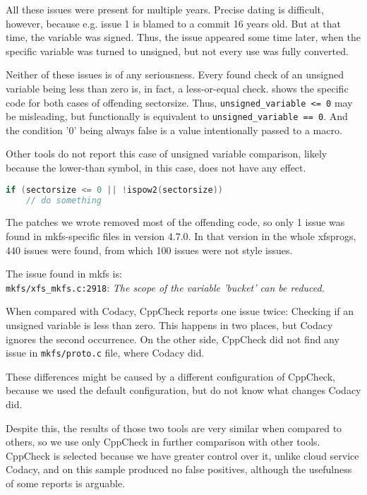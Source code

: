 All these issues were present for multiple years. Precise dating is
difficult, however, because e.g. issue 1 is blamed to a commit 16 years
old. But at that time, the variable was signed. Thus, the issue appeared
some time later, when the specific variable was turned to unsigned, but not
every use was fully converted.

Neither of these issues is of any seriousness. Every found check of an
unsigned variable being less than zero is, in fact, a less-or-equal
check.  shows the specific code for both cases
of offending sectorsize. Thus, {\tt unsigned\_variable <= 0} may be
misleading, but functionally is equivalent to {\tt unsigned\_variable ==
0}.  And the condition '0' being always false is a value intentionally
passed to a macro.

Other tools do not report this case of unsigned variable comparison,
likely because the lower-than symbol, in this case, does not have any effect.

\begin{lstlisting}[frame=none, basicstyle=\footnotesize\ttfamily,
language=C, numbers=none, numberstyle=\tiny\color{black},caption=
{Condition in which unsigned sectorsize is tested to be less than zero.},
label={lst:results:sectorsize}]
if (sectorsize <= 0 || !ispow2(sectorsize))
	// do something
\end{lstlisting}

The patches we wrote removed most of the offending code, so only 1 issue was
found in mkfs-specific files in version 4.7.0. In that version in the whole
xfsprogs, 440 issues were found, from which 100 issues were not style issues.

The issue found in mkfs  is:\\
{\tt mkfs/xfs\_mkfs.c:2918}: {\em The scope of the variable 'bucket' can be
reduced.}

When compared with Codacy, CppCheck reports one issue twice: Checking if an
unsigned variable is less than zero. This happens in two places, but Codacy
ignores the second occurrence. On the other side, CppCheck did not find any
issue in {\tt mkfs/proto.c} file, where Codacy did.

These differences might be caused by a different configuration of CppCheck,
because we used the default configuration, but do not know what changes
Codacy did.

Despite this, the results of those two tools are very similar when compared
to others, so we use only CppCheck in further comparison with other tools.
CppCheck is selected because we have greater control over it, unlike cloud
service Codacy, and on this sample produced no false positives, although the
usefulness of some reports is arguable.

